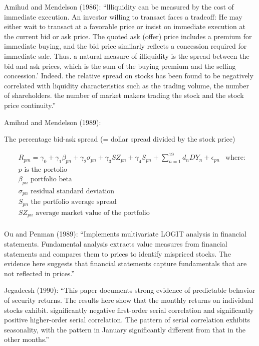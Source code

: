 \documentclass[
  letterpaper,
  DIV=11,
  numbers=noendperiod]{scrreprt}
\begin{document}
Amihud and Mendelson (1986): ``llliquidity can be measured by the cost
of immediate execution. An investor willing to transact faces a
tradeoff: He may either wait to transact at a favorable price or insist
on immediate execution at the current bid or ask price. The quoted ask
(offer) price includes a premium for immediate buying, and the bid price
similarly reflects a concession required for immediate sale. Thus. a
natural measure of illiquidity is the spread between the bid and ask
prices, which is the sum of the buying premium and the selling
concession.' Indeed. the relative spread on stocks has been found to be
negatively correlated with liquidity characteristics such as the trading
volume, the number of shareholders. the number of market makers trading
the stock and the stock price continuity.''

Amihud and Mendelson (1989):

The percentage bid-ask spread (= dollar spread divided by the stock
price)

\begin{align}
    &R_{pm} = \gamma_{0}+\gamma_{1}\beta_{pn}+\gamma_{2}\sigma_{pn}+\gamma_{3}SZ_{pn}+\gamma_{4}S_{pn}+\sum_{n=1}^{19}d_n{DY}_n+\epsilon_{pn}
    &\text{where: } \nonumber \\
    & p \text{ is the portolio} \nonumber \\
    & \beta_{pn} \text{ portfolio beta} \nonumber \\
    & \sigma_{pn} \text{ residual standard deviation} \nonumber \\
    & S_{pn} \text{ the portfolio average spread} \nonumber \\
    & {SZ}_{pn} \text{ average market value of the portfolio} \nonumber \\
\end{align}
\label{Equation:amihud1989effectsEquation2}

Ou and Penman (1989): ``Implements multivariate LOGIT analysis in
financial statements. Fundamental analysis extracts value measures from
financial statements and compares them to prices to identify mispriced
stocks. The evidence here suggests that financial statements capture
fundamentals that are not reflected in prices.''

Jegadeesh (1990): ``This paper documents strong evidence of predictable
behavior of security returns. The results here show that the monthly
returns on individual stocks exhibit. significantly negative first-order
serial correlation and significantly positive higher-order serial
correlation. The pattern of serial correlation exhibits seasonality,
with the pattern in January significantly different from that in the
other months.''
\end{document}
